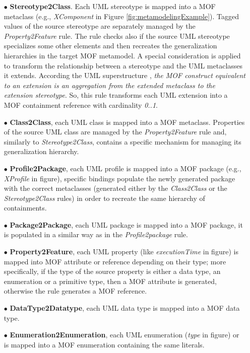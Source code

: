\begin{itemize}
	\item[$\bullet$] \textbf{Stereotype2Class}. Each UML stereotype is mapped into a MOF metaclass 
	(e.g., \textit{XComponent} in Figure \ref{fig:metamodelingExample}).  		
	Tagged values of the source stereotype are separately managed by the \textit{Property2Feature} rule. 
	The rule checks also if the source UML stereotype specializes some other elements and then 
	recreates the generalization hierarchies in the target MOF metamodel.
	A special consideration is applied to transform the relationship between a stereotype and the UML metaclasses it extends.
	According the UML superstructure \cite{UML}, \textit{the MOF construct equivalent to an extension is an aggregation from
	the extended metaclass to the extension stereotype}. So, this rule transforms each UML extension into 
	a MOF containment reference with cardinality \textit{0..1}. 	
	\item[$\bullet$] \textbf{Class2Class}, each UML class is mapped into a MOF metaclass. 
	Properties of the source UML class are managed by the \textit{Property2Feature} rule and, similarly to \textit{Stereotype2Class},
	contains a specific mechanism for managing its generalization hierarchy.
	\item[$\bullet$] \textbf{Profile2Package}, each UML profile is mapped into a MOF package (e.g.,\textit{ XProfile} in figure), specific bindings populate the newly generated 
	package with the correct metaclasses (generated either by the \textit{Class2Class} or the \textit{Stereotype2Class} rules) in order to
	recreate the same hierarchy of containments. 
	\item[$\bullet$] \textbf{Package2Package}, each UML package is mapped into a MOF package, 
	it is populated in a similar way as in the \textit{Profile2package} rule.
	\item[$\bullet$] \textbf{Property2Feature}, each UML property (like \textit{executionTime} in figure) 
	is mapped into MOF attribute or reference depending on their type; 
	more specifically, if the type of the source property is either a data type, an enumeration or a primitive type, 
	then a MOF attribute is generated, otherwise the rule generates a MOF reference.  
	\item[$\bullet$] \textbf{DataType2Datatype}, each UML data type is mapped into a MOF data type.
	\item[$\bullet$] \textbf{Enumeration2Enumeration}, each UML enumeration (\textit{type} in figure) 
	or is mapped into a MOF enumeration containing the same literals.
\end{itemize}

